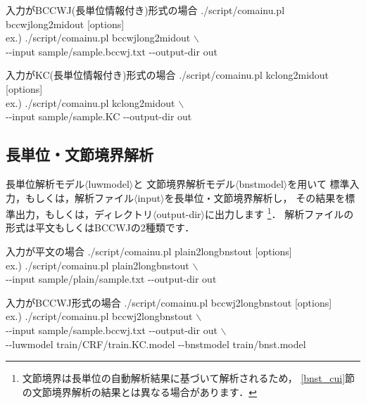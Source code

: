 \documentclass[titlepage]{jarticle}
\begin{document}
\begin{itembox}[l]{入力がBCCWJ(長単位情報付き)形式の場合}
./script/comainu.pl bccwjlong2midout [options] \\
ex.) ./script/comainu.pl bccwjlong2midout $\backslash$ \\
\hspace{10mm} {-}{-}input sample/sample.bccwj.txt {-}{-}output-dir out
\end{itembox}

 \begin{itembox}[l]{入力がKC(長単位情報付き)形式の場合}
./script/comainu.pl kclong2midout [options] \\
ex.) ./script/comainu.pl kclong2midout $\backslash$ \\
\hspace{10mm} {-}{-}input sample/sample.KC {-}{-}output-dir out
\end{itembox}


\subsection{長単位・文節境界解析}\label{long_bnst_cui}
長単位解析モデル$\langle$luwmodel$\rangle$と
文節境界解析モデル$\langle$bnstmodel$\rangle$を用いて
標準入力，もしくは，解析ファイル$\langle$input$\rangle$を長単位・文節境界解析し，
その結果を標準出力，もしくは，ディレクトリ$\langle$output-dir$\rangle$に出力します
\footnote{
文節境界は長単位の自動解析結果に基づいて解析されるため，
\ref{bnst_cui}節の文節境界解析の結果とは異なる場合があります．
}．
解析ファイルの形式は平文もしくはBCCWJの2種類です．


\begin{itembox}[l]{入力が平文の場合}
./script/comainu.pl plain2longbnstout [options] \\
ex.) ./script/comainu.pl plain2longbnstout $\backslash$ \\
\hspace{10mm} {-}{-}input sample/plain/sample.txt {-}{-}output-dir out
\end{itembox}

\begin{itembox}[l]{入力がBCCWJ形式の場合}
./script/comainu.pl bccwj2longbnstout [options] \\
ex.) ./script/comainu.pl bccwj2longbnstout $\backslash$ \\
\hspace{10mm} {-}{-}input sample/sample.bccwj.txt {-}{-}output-dir out $\backslash$ \\
\hspace{10mm} {-}{-}luwmodel train/CRF/train.KC.model {-}{-}bnstmodel train/bnst.model
\end{itembox}
\end{document}
